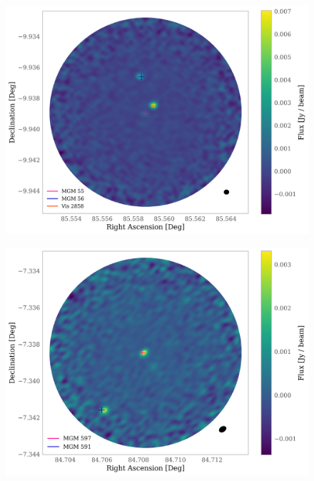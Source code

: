 \documentclass{aa}
\begin{document}
\begin{appendix}
\begin{figure}
\centering
   \includegraphics[width=\columnwidth]{MGM_55.png}
     \caption{}
\end{figure}

\begin{figure}
\centering
   \includegraphics[width=\columnwidth]{MGM_597.png}
     \caption{}
\end{figure}


\end{appendix}
\end{document}
